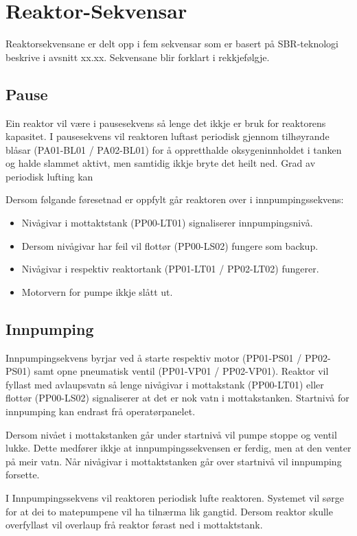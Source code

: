 \newpage
\section{Reaktor-Sekvensar}
Reaktorsekvensane er delt opp i fem sekvensar som er basert på SBR-teknologi beskrive i avsnitt xx.xx.
Sekvensane blir forklart i rekkjefølgje.

\subsection{Pause}
Ein reaktor vil være i pausesekvens så lenge det ikkje er bruk for reaktorens kapasitet. I pausesekvens vil reaktoren luftast periodisk gjennom tilhøyrande blåsar (PA01-BL01 / PA02-BL01) 
for å oppretthalde oksygeninnholdet i tanken og halde slammet aktivt, men samtidig ikkje bryte det heilt ned. Grad av periodisk lufting kan

Dersom følgande føresetnad er oppfylt går reaktoren over i innpumpingssekvens:
\begin{itemize}
    \item Nivågivar i mottaktstank (PP00-LT01) signaliserer innpumpingsnivå.
    \item Dersom nivågivar har feil vil flottør (PP00-LS02) fungere som backup.
    \item Nivågivar i respektiv reaktortank (PP01-LT01 / PP02-LT02) fungerer.
    \item Motorvern for pumpe ikkje slått ut.
\end{itemize}

\subsection{Innpumping}
Innpumpingsekvens byrjar ved å starte respektiv motor (PP01-PS01 / PP02-PS01) samt opne pneumatisk ventil (PP01-VP01 / PP02-VP01). 
Reaktor vil fyllast med avlaupsvatn så lenge nivågivar i mottakstank (PP00-LT01) eller flottør (PP00-LS02) signaliserer at det er nok vatn i mottakstanken. 
Startnivå for innpumping kan endrast frå operatørpanelet.

Dersom nivået i mottakstanken går under startnivå vil pumpe stoppe og ventil lukke. 
Dette medfører ikkje at innpumpingssekvensen er ferdig, men at den venter på meir vatn. 
Når nivågivar i mottaktstanken går over startnivå vil innpumping forsette. 

I Innpumpingssekvens vil reaktoren periodisk lufte reaktoren.
Systemet vil sørge for at dei to matepumpene vil ha tilnærma lik gangtid.
Dersom reaktor skulle overfyllast vil overlaup frå reaktor førast ned i mottaktstank.

